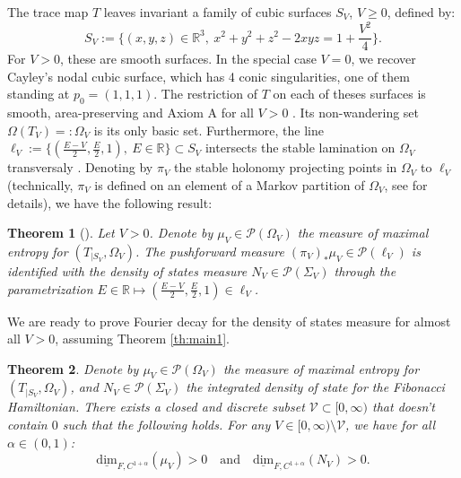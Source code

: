 \documentclass[a4paper]{article}
\newtheorem{theorem}{Theorem}[section]
\theoremstyle{definition}
\begin{document}
The trace map $T$ leaves invariant a family of cubic surfaces $S_V$, $V \geq 0$, defined by:
$$ S_V := \{ (x,y,z) \in \mathbb{R}^3, \ x^2+y^2+z^2-2xyz = 1+\frac{V^2}{4} \}. $$
For $V>0$, these are smooth surfaces. In the special case $V=0$, we recover Cayley's nodal cubic surface, which has 4 conic singularities, one of them standing at $p_0 = (1,1,1)$. The restriction of $T$ on each of theses surfaces is smooth, area-preserving and Axiom A for all $V>0$ \cite{DG09,DGY16}. Its non-wandering set $\Omega(T_{V}) =: \Omega_V$ is its only basic set. Furthermore, the line $\ell_V := \{ (\frac{E-V}{2},\frac{E}{2}, 1), \ E \in \mathbb{R} \} \subset S_V$ intersects the stable lamination on $\Omega_V$  transversaly \cite{DG09,DGY16}. Denoting by $\pi_V$ the stable holonomy projecting points in $\Omega_V$ to $\ell_V$ (technically, $\pi_V$ is defined on an element of a Markov partition of $\Omega_V$, see \cite{DG09,DGY16} for details), we have the following result:

\begin{theorem}[\cite{DG09,DGY16}]\label{th:IDSchara}
Let $V>0$. Denote by $\mu_V \in \mathcal{P}(\Omega_V)$ the measure of maximal entropy for $(T_{|S_V},\Omega_V)$. The pushforward measure $(\pi_V)_* \mu_V \in \mathcal{P}(\ell_V)$ is identified with the density of states measure $N_V \in \mathcal{P}(\Sigma_V)$ through the parametrization $E \in \mathbb{R} \mapsto (\frac{E-V}{2},\frac{E}{2},1) \in \ell_V$.
\end{theorem}

We are ready to prove Fourier decay for the density of states measure for almost all $V>0$, assuming Theorem \ref{th:main1}.

\begin{theorem}\label{th:IDS3}
Denote by $\mu_V \in \mathcal{P}(\Omega_V)$ the measure of maximal entropy for $(T_{|S_V},\Omega_V)$, and $N_V \in \mathcal{P}(\Sigma_V)$ the integrated density of state for the Fibonacci Hamiltonian. There exists a closed and discrete subset $\mathcal{V}\subset [0,\infty)$ that doesn't contain $0$ such that the following holds. For any $V \in [0,\infty) \setminus \mathcal{V}$, we have for all $\alpha \in (0,1)$:
$$   \underline{\text{dim}}_{F,C^{1+\alpha}}(\mu_V) > 0 \quad \text{and} \quad \underline{\text{dim}}_{F,C^{1+\alpha}}(N_V) > 0 . $$
\end{theorem}
\end{document}
